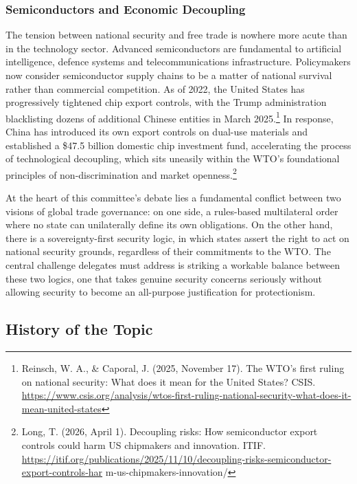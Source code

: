 \subsubsection{Semiconductors and Economic Decoupling}

The tension between national security and free trade is nowhere more acute than in the technology sector. Advanced semiconductors are fundamental to artificial intelligence, defence systems and telecommunications infrastructure. Policymakers now consider semiconductor supply chains to be a matter of national survival rather than commercial competition. As of 2022, the United States has progressively tightened chip export controls, with the Trump administration blacklisting dozens of additional Chinese entities in March 2025.\footnote{Reinsch, W. A., \& Caporal, J. (2025, November 17). The WTO's first ruling on national security: What does it mean for the United States? CSIS. \url{https://www.csis.org/analysis/wtos-first-ruling-national-security-what-does-it-mean-united-states}} In response, China has introduced its own export controls on dual-use materials and established a \$47.5 billion domestic chip investment fund, accelerating the process of technological decoupling, which sits uneasily within the WTO's foundational principles of non-discrimination and market openness.\footnote{Long, T. (2026, April 1). Decoupling risks: How semiconductor export controls could harm US chipmakers and innovation. ITIF. \url{https://itif.org/publications/2025/11/10/decoupling-risks-semiconductor-export-controls-har} m-us-chipmakers-innovation/}

At the heart of this committee's debate lies a fundamental conflict between two visions of global trade governance: on one side, a rules-based multilateral order where no state can unilaterally define its own obligations. On the other hand, there is a sovereignty-first security logic, in which states assert the right to act on national security grounds, regardless of their commitments to the WTO. The central challenge delegates must address is striking a workable balance between these two logics, one that takes genuine security concerns seriously without allowing security to become an all-purpose justification for protectionism.

\subsection{History of the Topic}

